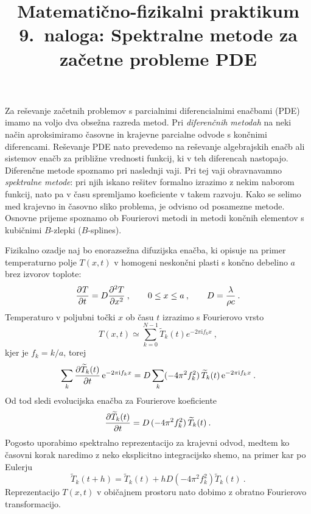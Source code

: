 \documentclass[slovene,11pt,a4paper]{article}
\title{
\sc\large Matematično-fizikalni praktikum \thisyear\\
\bigskip
\bf\Large 9.~naloga: Spektralne metode za začetne probleme PDE
}
\author{}
\date{}
\newcommand{\pd}{\partial}
\newcommand{\Pd}[3][{}]{\frac{\pd^{#1} #2}{\pd #3^{#1}}}
\begin{document}
\maketitle
\vspace{-1cm}

Za reševanje začetnih problemov s parcialnimi diferencialnimi
enačbami (PDE) imamo na voljo dva obsežna razreda metod.
Pri {\sl diferenčnih metodah\/} na neki način aproksimiramo
časovne in krajevne parcialne odvode s končnimi diferencami.
Reševanje PDE nato prevedemo na reševanje algebrajskih enačb
ali sistemov enačb za približne vrednosti funkcij, ki v teh
diferencah nastopajo.  Diferenčne metode spoznamo pri
naslednji vaji.  Pri tej vaji obravnavamno {\sl spektralne metode\/}:
pri njih iskano rešitev formalno izrazimo z nekim naborom funkcij,
nato pa v času spremljamo koeficiente v takem razvoju.  Kako se
selimo med krajevno in časovno sliko problema, je odvisno
od posamezne metode.  Osnovne prijeme spoznamo ob Fourierovi
metodi in  metodi končnih elementov s kubičnimi $B$-zlepki ($B$-splines).

Fizikalno ozadje naj bo enorazsežna difuzijska enačba,
ki opisuje na primer temperaturno polje $T(x,t)$ v homogeni
neskončni plasti s končno debelino $a$ brez izvorov toplote:
\begin{equation*}
\Pd{T}{t} = D\Pd[2]{T}{x}
 \>, \qquad 0\le x \le a \>, \qquad D={\lambda\over \rho c} \>.
\end{equation*}
Temperaturo v poljubni točki $x$ ob času $t$ izrazimo
s Fourierovo vrsto
\begin{equation*}
T(x,t) \simeq \sum_{k=0}^{N-1} \widetilde{T}_k(t)
e^{-2\pi\mathrm{i} f_k x} \>,
\end{equation*}
kjer je $f_k = k/a$, torej
\begin{equation*}
\sum_k {\partial\widetilde{T}_k(t)\over\partial t}\,
\mathrm{e}^{-2\pi\mathrm{i} f_k x} =
D \sum_k (-4\pi^2 f_k^2) \, \widetilde{T}_k(t) \,
\mathrm{e}^{-2\pi\mathrm{i} f_k x} \>.
\end{equation*}
Od tod sledi evolucijska enačba za Fourierove koeficiente
\begin{equation}
{\partial\widetilde{T}_k(t)\over\partial t} =
D \, (-4\pi^2 f_k^2) \, \widetilde{T}_k(t) \>.
\label{eq:num}
\end{equation}
Pogosto uporabimo spektralno reprezentacijo za krajevni odvod,
medtem ko časovni korak naredimo z neko eksplicitno integracijsko
shemo, na primer kar po Eulerju
\begin{equation}
\widetilde{T}_k(t+h) = \widetilde{T}_k(t)
+ h D (-4\pi^2 f_k^2) \widetilde{T}_k(t) \>.
\label{ffteuler}
\end{equation}
Reprezentacijo $T(x,t)$ v običajnem prostoru nato dobimo
z obratno Fourierovo transformacijo.
\end{document}
